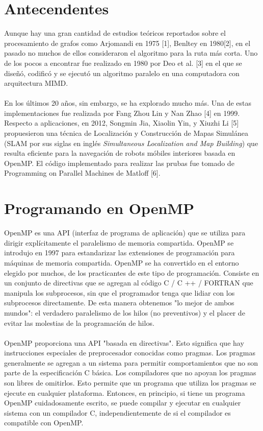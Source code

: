 \documentclass[11pt]{article}
\begin{document}
\section{Antecendentes}
Aunque hay una gran cantidad de estudios teóricos reportados sobre el procesamiento de grafos como Arjomandi en 1975 [1], Benltey en 1980[2], en el pasado no muchos de ellos consideraron el algoritmo para la ruta más corta. Uno de los pocos a encontrar fue realizado en 1980 por Deo et al. [3] en el que se diseñó, codificó y se ejecutó un algoritmo paralelo en una computadora con arquitectura MIMD. 

\paragraph*{}
En los últimos 20 años, sin embargo, se ha explorado mucho más. Una de estas implementaciones fue realizada por Fang Zhou Lin y Nan Zhao [4] en 1999. Respecto a aplicaciones, en 2012, Songmin Jia, Xiaolin Yin, y Xiuzhi Li [5] propuesieron una técnica de Localización y Construcción de Mapas Simulánea (SLAM por sus siglas en inglés \textit {Simultaneous Localization and Map Building}) que resulta eficiente para la navegación de robots móbiles interiores basada en OpenMP. 
El código implementado para realizar las prubas fue tomado de Programming on Parallel Machines de Matloff [6].


\section{Programando en OpenMP}
OpenMP es una API (interfaz de programa de aplicación) que se utiliza para dirigir explícitamente el paralelismo de memoria compartida. OpenMP se introdujo en 1997 para estandarizar las extensiones de programación para máquinas de memoria compartida. OpenMP se ha convertido en el entorno elegido por muchos, de los practicantes de este tipo de programación. Consiste en un conjunto de directivas que se agregan al código C / C ++ / FORTRAN que manipula los subprocesos, sin que el programador tenga que lidiar con los subprocesos directamente. De esta manera obtenemos "lo mejor de ambos mundos": el verdadero paralelismo de los hilos (no preventivos) y el placer de evitar las molestias de la programación de hilos. 

\paragraph{}
OpenMP proporciona una API "basada en directivas". Esto significa que hay instrucciones especiales de preprocesador conocidas como pragmas. Los pragmas generalmente se agregan a un sistema para permitir comportamientos que no son parte de la especificación C básica. Los compiladores que no apoyan los pragmas son libres de omitirlos. Esto permite que un programa que utiliza los pragmas se ejecute en cualquier plataforma. Entonces, en principio, si tiene un programa OpenMP cuidadosamente escrito, se puede compilar y ejecutar en cualquier sistema con un compilador C, independientemente de
si el compilador es compatible con OpenMP.
\end{document}
